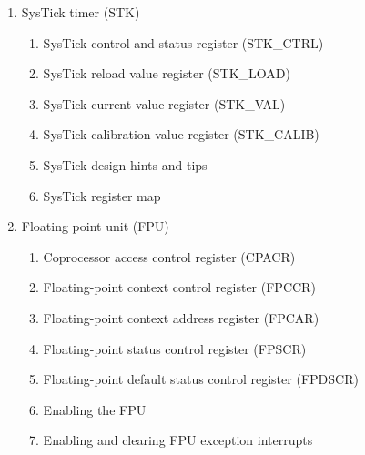 \documentclass{article}
\begin{document}
\begin{enumerate}
\begin{enumerate}
\begin{enumerate}
            \item Memory management fault address register (MMFAR) 
            \item Bus fault address register (BFAR) 
            \item Auxiliary fault status register (AFSR) 
            \item System control block design hints and tips 
            \item SCB register map 
        \end{enumerate}
        \item SysTick timer (STK) 
        \begin{enumerate}
            \item SysTick control and status register (STK\_CTRL) 
            \item SysTick reload value register (STK\_LOAD) 
            \item SysTick current value register (STK\_VAL) 
            \item SysTick calibration value register (STK\_CALIB) 
            \item SysTick design hints and tips 
            \item SysTick register map 
        \end{enumerate}
        \item Floating point unit (FPU) 
        \begin{enumerate}
            \item Coprocessor access control register (CPACR) 
            \item Floating-point context control register (FPCCR) 
            \item Floating-point context address register (FPCAR) 
            \item Floating-point status control register (FPSCR) 
            \item Floating-point default status control register (FPDSCR) 
            \item Enabling the FPU 
            \item Enabling and clearing FPU exception interrupts 
        \end{enumerate}
    \end{enumerate}
\end{enumerate}
\end{document}
